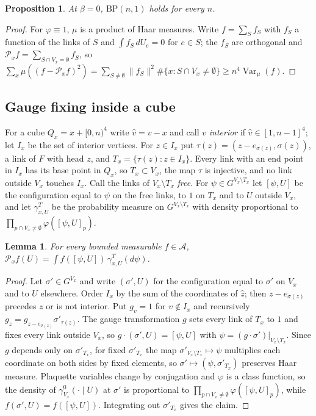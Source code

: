 \documentclass[11pt]{amsart}
\newtheorem{lemma}[theorem]{Lemma}
\newtheorem{proposition}[theorem]{Proposition}
\theoremstyle{definition}
\theoremstyle{remark}
\numberwithin{equation}{section}
\newcommand{\Var}{\operatorname{Var}}
\newcommand{\BP}{\mathrm{BP}}
\begin{document}
\begin{proposition}\label{prop:bpsup}
At $\beta=0$, $\BP(n,1)$ holds for every $n$.
\end{proposition}

\begin{proof}
For $\varphi\equiv1$, $\mu$ is a product of Haar measures. Write $f=\sum_Sf_S$
with $f_S$ a function of the links of $S$ and $\int f_S\,dU_e=0$ for $e\in S$;
the $f_S$ are orthogonal and $\mathcal P_xf=\sum_{S\cap V_x=\emptyset}f_S$, so
$\sum_x\mu((f-\mathcal P_xf)^2)=\sum_{S\ne\emptyset}\|f_S\|^2\#\{x:S\cap V_x\ne
\emptyset\}\ge n^4\Var_\mu(f)$.
\end{proof}

\subsection*{Gauge fixing inside a cube}
For a cube $Q_x=x+[0,n)^4$ write $\hat v=v-x$ and call $v$ \emph{interior} if
$\hat v\in[1,n-1]^4$; let $I_x$ be the set of interior vertices. For $z\in I_x$
put $\tau(z)=(z-e_{\sigma(z)},\sigma(z))$, a link of $F$ with head $z$, and
$T_x=\{\tau(z):z\in I_x\}$. Every link with an end point in $I_x$ has its base
point in $Q_x$, so $T_x\subset V_x$, the map $\tau$ is injective, and no link
outside $V_x$ touches $I_x$. Call the links of $V_x\setminus T_x$ \emph{free}.
For $\psi\in G^{V_x\setminus T_x}$ let $[\psi,U]$ be the configuration equal to
$\psi$ on the free links, to $1$ on $T_x$ and to $U$ outside $V_x$, and let
$\gamma^T_{x,U}$ be the probability measure on $G^{V_x\setminus T_x}$ with
density proportional to $\prod_{p\cap V_x\ne\emptyset}\varphi([\psi,U]_p)$.

\begin{lemma}\label{lem:cubegauge}
For every bounded measurable $f\in\mathcal A$,
$\mathcal P_xf(U)=\int f([\psi,U])\,\gamma^T_{x,U}(d\psi)$.
\end{lemma}

\begin{proof}
Let $\sigma'\in G^{V_x}$ and write $(\sigma',U)$ for the configuration equal to
$\sigma'$ on $V_x$ and to $U$ elsewhere. Order $I_x$ by the sum of the
coordinates of $\hat z$; then $z-e_{\sigma(z)}$ precedes $z$ or is not
interior. Put $g_v=1$ for $v\notin I_x$ and recursively $g_z=g_{z-e_{\sigma(z)}}
\sigma'_{\tau(z)}$. The gauge transformation $g$ sets every link of $T_x$ to $1$
and fixes every link outside $V_x$, so $g\cdot(\sigma',U)=[\psi,U]$ with
$\psi=(g\cdot\sigma')|_{V_x\setminus T_x}$. Since $g$ depends only on
$\sigma'_{T_x}$, for fixed $\sigma'_{T_x}$ the map $\sigma'_{V_x\setminus T_x}
\mapsto\psi$ multiplies each coordinate on both sides by fixed elements, so
$\sigma'\mapsto(\psi,\sigma'_{T_x})$ preserves Haar measure. Plaquette variables
change by conjugation and $\varphi$ is a class function, so the density of
$\gamma^0_{V_x}(\cdot\mid U)$ at $\sigma'$ is proportional to
$\prod_{p\cap V_x\ne\emptyset}\varphi([\psi,U]_p)$, while $f(\sigma',U)=
f([\psi,U])$. Integrating out $\sigma'_{T_x}$ gives the claim.
\end{proof}
\end{document}
